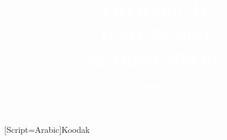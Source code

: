 

\newcommand{\confTitle}{Electronic II} %
\newcommand{\hmwkDueDate}{TonD Project} %
\newcommand{\Places}{by Bijan Binaee} %
\newcommand{\confCompany}{Summary} %


\title{
\vspace{3.5in}
\textcolor{white}{\textmd{\fontsize{40}{40}\textbf{\confTitle}}\\
\vspace{3.75in}
\small{\hmwkDueDate}\\
\large{\textit{\Places}}
}
}

\author{\textcolor{white}{\textbf{\confCompany}}}
\date{} %


\newfontfamily{\arabicfont}[Script=Arabic]{Koodak}

